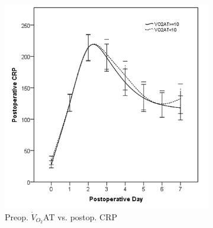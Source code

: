 %

\clearpage
\begin{figure}[p]
	\caption{Relationship between preoperative $\dot{V}_{O_2}$AT and postoperative inflammatory markers in the first week after pancreaticoduodenectomy.}
	\label{fig:sirs_at}
	\centering
	\begin{subfigure}{0.48\textwidth}
		\centering
		\includegraphics[width=\textwidth]{Figures/sirs_at_crp}
		\caption{Preop. $\dot{V}_{O_2}$AT vs. postop. CRP}
		\label{fig:sirs_at_crp}
	\end{subfigure}
	\hfill
	\begin{subfigure}{0.48\textwidth}
		\centering

\end{subfigure}
\end{figure}
